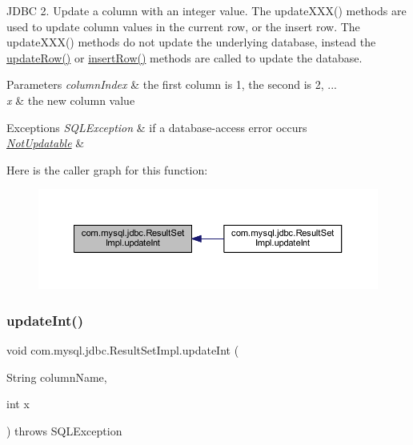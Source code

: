 J\+D\+BC 2. Update a column with an integer value. The update\+X\+X\+X() methods are used to update column values in the current row, or the insert row. The update\+X\+X\+X() methods do not update the underlying database, instead the \mbox{\hyperlink{classcom_1_1mysql_1_1jdbc_1_1_result_set_impl_a2842d32292d023aaeeafedeed3322981}{update\+Row()}} or \mbox{\hyperlink{classcom_1_1mysql_1_1jdbc_1_1_result_set_impl_a78e304e3279cbcf60392f18c1385e3bf}{insert\+Row()}} methods are called to update the database.


\begin{DoxyParams}{Parameters}
{\em column\+Index} & the first column is 1, the second is 2, ... \\
\hline
{\em x} & the new column value\\
\hline
\end{DoxyParams}

\begin{DoxyExceptions}{Exceptions}
{\em S\+Q\+L\+Exception} & if a database-\/access error occurs \\
\hline
{\em \mbox{\hyperlink{classcom_1_1mysql_1_1jdbc_1_1_not_updatable}{Not\+Updatable}}} & \\
\hline
\end{DoxyExceptions}
Here is the caller graph for this function\+:
\nopagebreak
\begin{figure}[H]
\begin{center}
\leavevmode
\includegraphics[width=350pt]{classcom_1_1mysql_1_1jdbc_1_1_result_set_impl_ad21e446740a13919c3728733d0bf1f10_icgraph}
\end{center}
\end{figure}
\mbox{\label{classcom_1_1mysql_1_1jdbc_1_1_result_set_impl_a511245808d1194c70a39d7066ffd0761}} 
\subsubsection{\texorpdfstring{update\+Int()}{updateInt()}\hspace{0.1cm}{\footnotesize\ttfamily [2/2]}}
{\footnotesize\ttfamily void com.\+mysql.\+jdbc.\+Result\+Set\+Impl.\+update\+Int (\begin{DoxyParamCaption}\item[{String}]{column\+Name,  }\item[{int}]{x }\end{DoxyParamCaption}) throws S\+Q\+L\+Exception}

